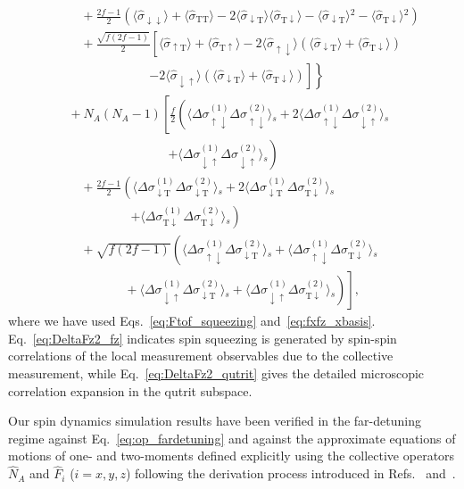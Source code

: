 \documentclass[aps,pra,twocolumn,superscriptaddress]{revtex4-1} %
\newcommand{\nn}{\nonumber}
\newcommand{\expect}[1]{\big\langle #1 \big\rangle}
\newcommand{\sigmaud}{\hat{\sigma}_{\uparrow\downarrow}}
\newcommand{\sigmaut}{\hat{\sigma}_{\uparrow \mathrm{T}}}
\newcommand{\sigmadu}{\hat{\sigma}_{\downarrow\uparrow}}
\newcommand{\sigmadd}{\hat{\sigma}_{\downarrow\downarrow}}
\newcommand{\sigmadt}{\hat{\sigma}_{\downarrow \mathrm{T}}}
\newcommand{\sigmatu}{\hat{\sigma}_{\mathrm{T}\uparrow}}
\newcommand{\sigmatd}{\hat{\sigma}_{\mathrm{T}\downarrow}}
\newcommand{\sigmatt}{\hat{\sigma}_{\mathrm{T}\mathrm{T}}}
\newcommand{\Dsigmaud}{\Delta\sigma_{\uparrow\downarrow}}
\newcommand{\Dsigmadu}{\Delta\sigma_{\downarrow\uparrow}}
\newcommand{\Dsigmadt}{\Delta\sigma_{\downarrow \mathrm{T}}}
\newcommand{\Dsigmatd}{\Delta\sigma_{\mathrm{T}\downarrow}}
\begin{document}
\begin{appendix}
\begin{subequations}
\begin{align}
	&\quad\quad+\! \frac{2f-1}{2}\!\!\left(\!\expect{\!\sigmadd}\!+\!\expect{\!\sigmatt\!}\!\!-\!2\expect{\!\sigmadt\!}\expect{\!\sigmatd}\!\!-\!\expect{\!\sigmadt\!}\!^2\!\!-\!\expect{\!\sigmatd}\!^2 \right)\nn\\
	&\quad\quad +\! \frac{\!\sqrt{f(2f\!-\!1)}}{2}\!\left[\!\expect{\!\sigmaut\! }\!+\!\expect{\!\sigmatu\!} \!-\!2\expect{\!\sigmaud}(\expect{\!\sigmadt\!}\!+\!\expect{\!\sigmatd})\right.\nn\\
	&\quad\quad\quad\quad\quad\quad\quad \left.\phantom{\frac{1}{1}}\left.-\!2\expect{\!\sigmadu\!}(\expect{\!\sigmadt\!}\!+\!\expect{\!\sigmatd} ) \right]\! \right\}\nn\\
	&\quad +\!N_A(N_A\!-\!1)\!\left[\!\frac{f}{2}\left(\expect{\!\Dsigmaud^{(\!1\!)}\Dsigmaud^{(\!2\!)} }\!_s \!+\! 2\expect{\!\Dsigmaud^{(\!1\!)}\Dsigmadu^{(\!2\!)} }\!_s \right.\right.\nn\\
	&\quad\quad\quad\quad\quad\quad\quad\quad\quad \left.+\! \expect{\!\Dsigmadu^{(\!1\!)}\Dsigmadu^{(\!2\!)} }\!_s \right) \nn\\
	&\quad\quad +\! \frac{2f\!-\!1}{2}\left(\expect{\!\Dsigmadt^{(\!1\!)}\Dsigmadt^{(\!2\!)} }\!_s \!+\!2\expect{\!\Dsigmadt^{(\!1\!)}\Dsigmatd^{(\!2\!)} }\!_s\right. \nn\\
	&\quad\quad\quad\quad\quad\quad \left. +\!\expect{\!\Dsigmatd^{(\!1\!)}\Dsigmatd^{(\!2\!)} }\!_s\right) \nn\\
	&\quad\quad +\! \left. \sqrt{\!f(2f\!-\!1)}\left(\expect{\!\Dsigmaud^{(\!1\!)}\Dsigmadt^{(\!2\!)} }\!_s \!+\!\expect{\!\Dsigmaud^{(\!1\!)}\Dsigmatd^{(\!2\!)} }\!_s\right.\right.\nn\\ &\quad\quad\quad\quad\quad\left.\phantom{\frac{1}{1}}\left.\!+\!\expect{\!\Dsigmadu^{(\!1\!)}\Dsigmadt^{(\!2\!)} }\!_s\!+\!\expect{\!\Dsigmadu^{(\!1\!)}\Dsigmatd^{(\!2\!)} }\!_s \right)\!\right]\!,\label{eq:DeltaFz2_qutrit}
	\end{align}
\end{subequations}
where we have used Eqs.~\eqref{eq:Ftof_squeezing} and~\eqref{eq:fxfz_xbasis}. Eq.~\eqref{eq:DeltaFz2_fz} indicates spin squeezing is generated by spin-spin correlations of the local measurement observables due to the collective measurement, while Eq.~\eqref{eq:DeltaFz2_qutrit} gives the detailed microscopic correlation expansion in the qutrit subspace.

Our spin dynamics simulation results have been verified in the far-detuning regime against Eq.~\eqref{eq:op_fardetuning} and against the approximate equations of motions of one- and two-moments defined explicitly using the collective operators $ \hat{N}_A $ and $ \hat{F}_i $ ($ i=x,y,z $) following the derivation process introduced in Refs.~\cite{Qi2016} and~\cite{Norris2014}.



\end{appendix}
\end{document}
